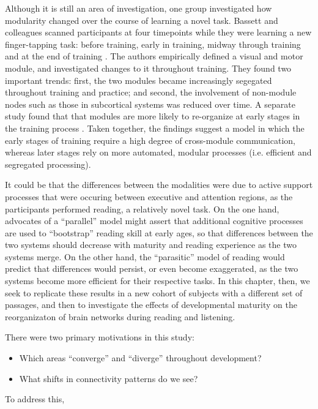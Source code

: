 Although it is still an area of investigation, one group investigated how modularity changed over the course of learning a novel task. Bassett and colleagues scanned participants at four timepoints while they were learning a new finger-tapping task: before training, early in training, midway through training and at the end of training \citep{Bassett2015}. The authors empirically defined a visual and motor module, and investigated changes to it throughout training. They found two important trends: first, the two modules became increasingly segegated throughout training and practice; and second, the involvement of non-module nodes such as those in subcortical systems was reduced over time. A separate study found that that modules are more likely to re-organize at early stages in the training process \citep{Bassett2011}. Taken together, the findings suggest a model in which the early stages of training require a high degree of cross-module communication, whereas later stages rely on more automated, modular processes (i.e. efficient and segregated processing). 

It could be that the differences between the modalities were due to active support processes that were occuring between executive and attention regions, as the participants performed reading, a relatively novel task. On the one hand, advocates of a ``parallel'' model might assert that additional cognitive processes are used to ``bootstrap'' reading skill at early ages, so that differences between the two systems should decrease with maturity and reading experience as the two systems merge. On the other hand, the ``parasitic'' model of reading would predict that differences would persist, or even become exaggerated, as the two systems become more efficient for their respective tasks. In this chapter, then, we seek to replicate these results in a new cohort of subjects with a different set of passages, and then to investigate the effects of developmental maturity on the reorganizaton of brain networks during reading and listening.

There were two primary motivations in this study:

\begin{itemize}
	\item Which areas ``converge'' and ``diverge'' throughout development?
	\item What shifts in connectivity patterns do we see?
\end{itemize} 

To address this, 

